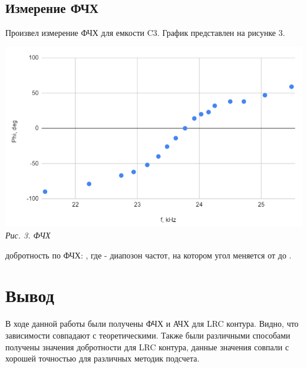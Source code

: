 \newpage

\subsection{Измерение ФЧХ}

Произвел измерение ФЧХ для емкости C3. График представлен на рисунке 3.

\begin{center}

    \includegraphics[scale=0.9]{picks/323-graph2.png} \\
    \textit{Рис. 3. ФЧХ}

\end{center}

 добротность по ФЧХ: , где  - диапозон частот, на котором угол меняется от  до .

\noindent{}

\section{Вывод}

В ходе данной работы были получены ФЧХ и АЧХ для LRC контура. Видно, что зависимости совпадают с теоретическими. Также были различными способами получены значения добротности для LRC контура, данные значения совпали с хорошей точностью для различных методик подсчета.